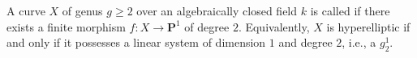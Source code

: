 A curve $X$ of genus $g \geqslant 2$ over an algebraically closed field $k$ is called  if there exists a finite morphism $f: X \to \mathbf{P}^1$ of degree $2$. Equivalently, $X$ is hyperelliptic if and only if it possesses a linear system of dimension $1$ and degree $2$, i.e., a $g_2^1$.
